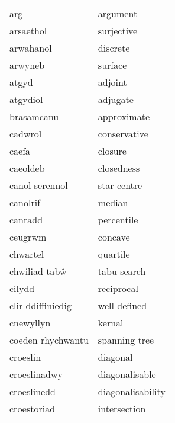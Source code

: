 \begin{supertabular}{p{0.22\textwidth}p{0.22\textwidth}}
                             arg &                          argument \\
                       arsaethol &                        surjective \\
                       arwahanol &                          discrete \\
                         arwyneb &                           surface \\
                           atgyd &                           adjoint \\
                        atgydiol &                          adjugate \\
                      brasamcanu &                       approximate \\
                         cadwrol &                      conservative \\
                           caefa &                           closure \\
                        caeoldeb &                        closedness \\
                  canol serennol &                       star centre \\
                        canolrif &                            median \\
                         canradd &                        percentile \\
                         ceugrwm &                           concave \\
                        chwartel &                          quartile \\
                   chwiliad tabŵ &                       tabu search \\
                          cilydd &                        reciprocal \\
               clir-ddiffiniedig &                      well defined \\
                       cnewyllyn &                            kernal \\
               coeden rhychwantu &                     spanning tree \\
                        croeslin &                          diagonal \\
                    croeslinadwy &                    diagonalisable \\
                     croeslinedd &                 diagonalisability \\
                     croestoriad &                      intersection \\

\end{supertabular}
